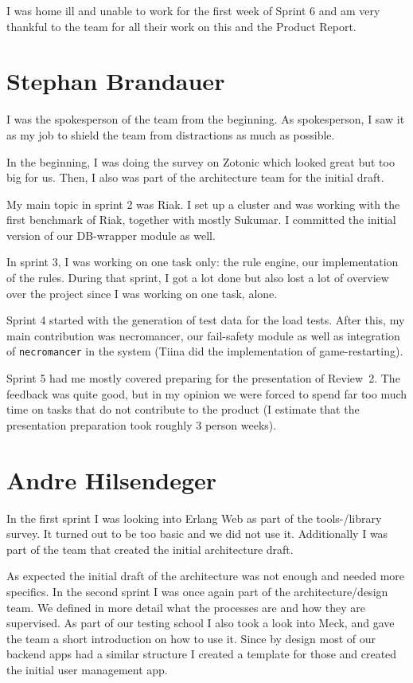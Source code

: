\documentclass[11pt,a4paper]{report}
\begin{document}
I was home ill and unable to work for the first week of Sprint 6 and am very
thankful to the team for all their work on this and the Product Report.

\section{Stephan Brandauer}
I was the spokesperson of the team from the beginning. As spokesperson,
I saw it as my job to shield the team from distractions as much as possible.

In the beginning, I was doing the survey on Zotonic which looked great but too
big for us. Then, I also was part of the architecture team for the initial
draft.

My main topic in sprint 2 was Riak. I set up a cluster and was working with the
first benchmark of Riak, together with mostly Sukumar.
I committed the initial version of our DB-wrapper module as well.

In sprint 3, I was working on one task only: the rule engine, our implementation
of the rules. During that sprint, I got a lot done but also lost a lot of
overview over the project since I was working on one task, alone.

Sprint 4 started with the generation of test data for the load tests. After
this, my main contribution was necromancer, our fail-safety module as well as
integration of {\tt necromancer} in the system (Tiina did the implementation
of game-restarting).

Sprint 5 had me mostly covered preparing for the presentation of Review~2.
The feedback was quite good, but in my opinion we were forced to spend far too
much time on tasks that do not contribute to the product (I estimate that the
presentation preparation took roughly 3 person weeks).

\section{Andre Hilsendeger}
In the first sprint I was looking into Erlang Web as part of the tools-/library
survey. It turned out to be too basic and we did not use it. Additionally I was
part of the team that created the initial architecture draft.

As expected the initial draft of the architecture was not enough and needed more
specifics. In the second sprint I was once again part of the architecture/design
team. We defined in more detail what the processes are and how they are
supervised. As part of our testing school I also took a look into Meck, and gave
the team a short introduction on how to use it. Since by design most of our
backend apps had a similar structure I created a template for those and created
the initial user management app.
\end{document}
